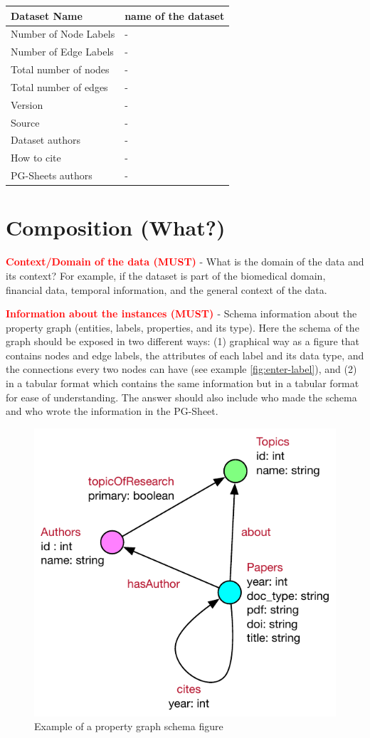 \documentclass[letterpaper,11pt]{article}
\begin{document}
\begin{table}[htb]\color{red}
\centering
\small\begin{tabular}{|l|l|}
\hline
Dataset Name & name of the dataset \\ \hline
Number of Node Labels & - \\ \hline
Number of Edge Labels & - \\ \hline
Total number of nodes & - \\ \hline
Total number of edges & - \\ \hline
Version & - \\ \hline
Source & - \\ \hline
Dataset authors & - \\ \hline
How to cite & - \\ \hline
PG-Sheets authors & -  \\ \hline
\end{tabular}
\end{table}

\section{Composition (What?)}

\textbf{\textcolor{red}{Context/Domain of the data (MUST)}} - What is the domain of the data and its context? For example, if the dataset is part of the biomedical domain, financial data, temporal information, and the general context of the data. 

\textbf{\textcolor{red}{Information about the instances (MUST) }} - Schema information about the property graph (entities, labels, properties, and its type). Here the schema of the graph should be exposed in two different ways: (1) graphical way as a figure that contains nodes and edge labels, the attributes of each label and its data type, and the connections every two nodes can have (see example \autoref{fig:enter-label}), and (2) in a tabular format which contains the same information but in a tabular format for ease of understanding. The answer should also include who made the schema and who wrote the information in the PG-Sheet. %

\begin{figure}
    \centering
    \includegraphics[width=0.4\linewidth]{pgsheetsExampleSchema.pdf}
    \caption{Example of a property graph schema figure}
    \label{fig:enter-label}
\end{figure}
\end{document}
